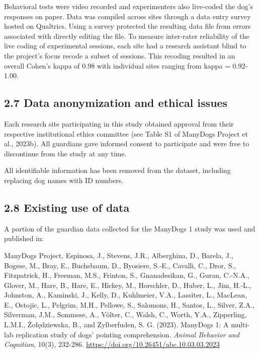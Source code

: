 \documentclass[
  pub,floatsintext]{apa6}
\begin{document}
Behavioral tests were video recorded and experimenters also live-coded the dog's responses on paper. Data was compiled across sites through a data entry survey hosted on Qualtrics. Using a survey protected the resulting data file from errors associated with directly editing the file. To measure inter-rater reliability of the live coding of experimental sessions, each site had a research assistant blind to the project's focus recode a subset of sessions. This recoding resulted in an overall Cohen's kappa of 0.98 with individual sites ranging from kappa = 0.92-1.00.

\hypertarget{data-anonymization-and-ethical-issues}{%
\subsection{2.7 Data anonymization and ethical issues}\label{data-anonymization-and-ethical-issues}}

Each research site participating in this study obtained approval from their respective institutional ethics committee (see Table S1 of ManyDogs Project et al., 2023b). All guardians gave informed consent to participate and were free to discontinue from the study at any time.

All identifiable information has been removed from the dataset, including replacing dog names with ID numbers.

\hypertarget{existing-use-of-data}{%
\subsection{2.8 Existing use of data}\label{existing-use-of-data}}

A portion of the guardian data collected for the ManyDogs 1 study was used and published in:

ManyDogs Project, Espinosa, J., Stevens, J.R., Alberghina, D., Barela, J., Bogese, M., Bray, E., Buchsbaum, D., Byosiere, S.-E., Cavalli, C., Dror, S., Fitzpatrick, H., Freeman, M.S., Frinton, S., Gnanadesikan, G., Guran, C.-N.A., Glover, M., Hare, B., Hare, E., Hickey, M., Horschler, D., Huber, L., Jim, H.-L., Johnston, A., Kaminski, J., Kelly, D., Kuhlmeier, V.A., Lassiter, L., MacLean, E., Ostojic, L., Pelgrim, M.H., Pellowe, S., Salomons, H., Santos, L., Silver, Z.A., Silverman, J.M., Sommese, A., Völter, C., Walsh, C.,
Worth, Y.A., Zipperling, L.M.I., Żołędziewska, B., and Zylberfuden, S. G. (2023). ManyDogs 1: A multi-lab replication study of dogs' pointing comprehension. \emph{Animal Behavior and Cognition}, 10(3), 232-286.
\url{https://doi.org/10.26451/abc.10.03.03.2023}
\end{document}
